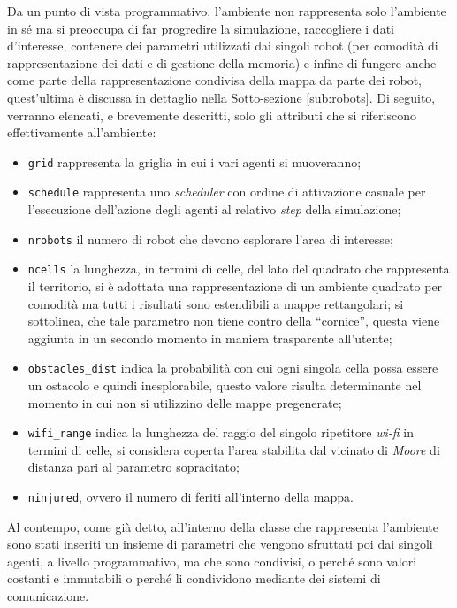 Da un punto di vista programmativo, l'ambiente non rappresenta solo l'ambiente in sé ma si preoccupa di far progredire la simulazione, raccogliere i dati d'interesse, contenere dei parametri utilizzati dai singoli robot (per comodità di rappresentazione dei dati e di gestione della memoria) e infine di fungere anche come parte della rappresentazione condivisa della mappa da parte dei robot, quest'ultima è discussa in dettaglio nella Sotto-sezione \ref{sub:robots}.
Di seguito, verranno elencati, e brevemente descritti, solo gli attributi che si riferiscono effettivamente all'ambiente:
\begin{itemize}
	\item \texttt{grid} rappresenta la griglia in cui i vari agenti si muoveranno;
	\item \texttt{schedule} rappresenta uno \textit{scheduler} con ordine di attivazione casuale per l'esecuzione dell'azione degli agenti al relativo \textit{step} della simulazione;
	\item \texttt{nrobots} il numero di robot che devono esplorare l'area di interesse;
	\item \texttt{ncells} la lunghezza, in termini di celle, del lato del quadrato che rappresenta il territorio, si è adottata una rappresentazione di un ambiente quadrato per comodità ma tutti i risultati sono estendibili a mappe rettangolari; si sottolinea, che tale parametro non tiene contro della “cornice”, questa viene aggiunta in un secondo momento in maniera trasparente all'utente;
	\item \texttt{obstacles\_dist} indica la probabilità con cui ogni singola cella possa essere un ostacolo e quindi inesplorabile, questo valore risulta determinante nel momento in cui non si utilizzino delle mappe pregenerate;
	\item \texttt{wifi\_range} indica la lunghezza del raggio del singolo ripetitore \textit{wi-fi} in termini di celle, si considera coperta l'area stabilita dal vicinato di \textit{Moore} di distanza pari al parametro sopracitato;
	\item \texttt{ninjured}, ovvero il numero di feriti all'interno della mappa.
\end{itemize}
Al contempo, come già detto, all'interno della classe che rappresenta l'ambiente sono stati inseriti un insieme di parametri che vengono sfruttati poi dai singoli agenti, a livello programmativo, ma che sono condivisi, o perché sono valori costanti e immutabili o perché li condividono mediante dei sistemi di comunicazione.
